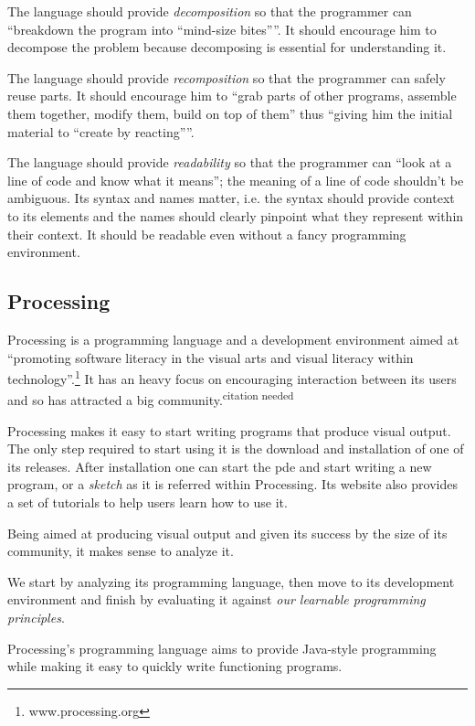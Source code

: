 \documentclass{./llncs2e/llncs}
\begin{document}
	The language should provide \emph{decomposition} so that the programmer can ``breakdown the program into ``mind-size bites''''. 
	It should encourage him to decompose the problem because decomposing is essential for understanding it.

	The language should provide \emph{recomposition} so that the programmer can safely reuse parts. 
	It should encourage him to ``grab parts of other programs, assemble them together, modify them, build on top of them'' thus ``giving him the initial material to ``create by reacting''''.

	The language should provide \emph{readability} so that the programmer can ``look at a line of code and know what it means''; the meaning of a line of code shouldn't be ambiguous. 
	Its syntax and names matter, i.e. the syntax should provide context to its elements and the names should clearly pinpoint what they represent within their context. 
	It should be readable even without a fancy programming environment.

\subsection{Processing\cite{reas2007processing}}
	Processing is a programming language and a development environment aimed at ``promoting software literacy in the visual arts and visual literacy within technology''.\footnote{www.processing.org} 
	It has an heavy focus on encouraging interaction between its users and so has attracted a big community.\textsuperscript{citation needed}

	Processing makes it easy to start writing programs that produce visual output. 
	The only step required to start using it is the download and installation of one of its releases. 
	After installation one can start the \ac{pde} and start writing a new program, or a \emph{sketch} as it is referred within Processing. 
	Its website also provides a set of tutorials to help users learn how to use it.

	Being aimed at producing visual output and given its success by the size of its community, it makes sense to analyze it.

	We start by analyzing its programming language, then move to its development environment and finish by evaluating it against \emph{our learnable programming principles}.

	Processing's programming language aims to provide Java-style programming while making it easy to quickly write functioning programs. 
\end{document}
